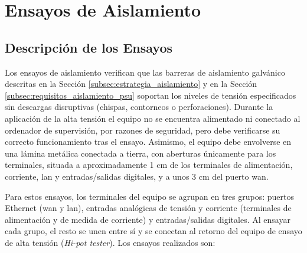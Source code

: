 \section{Ensayos de Aislamiento}
\label{sec:ensayos_aislamiento}

\subsection{Descripción de los Ensayos}
\label{subsec:descripcion_aislamiento}

Los ensayos de aislamiento verifican que las barreras de aislamiento galvánico descritas en la Sección \ref{subsec:estrategia_aislamiento} y en la Sección \ref{subsec:requisitos_aislamiento_psu} soportan los niveles de tensión especificados sin descargas disruptivas (chispas, contorneos o perforaciones). Durante la aplicación de la alta tensión el equipo no se encuentra alimentado ni conectado al ordenador de supervisión, por razones de seguridad, pero debe verificarse su correcto funcionamiento tras el ensayo. Asimismo, el equipo debe envolverse en una lámina metálica conectada a tierra, con aberturas únicamente para los terminales, situada a aproximadamente 1 cm de los terminales de alimentación, corriente, \gls{lan} y entradas/salidas digitales, y a unos 3 cm del puerto \gls{wan}.

Para estos ensayos, los terminales del equipo se agrupan en tres grupos: puertos Ethernet (\gls{wan} y \gls{lan}), entradas analógicas de tensión y corriente (terminales de alimentación y de medida de corriente) y entradas/salidas digitales. Al ensayar cada grupo, el resto se unen entre sí y se conectan al retorno del equipo de ensayo de alta tensión (\textit{Hi-pot tester}). Los ensayos realizados son:

